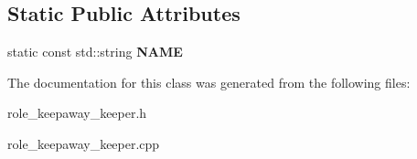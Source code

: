 \subsection*{Static Public Attributes}
\begin{DoxyCompactItemize}
\item 
\hypertarget{classRoleKeepawayKeeper_a5461ea1f8f0e319e8dd555f147e5b24d}{
static const std::string {\bfseries NAME}}
\label{classRoleKeepawayKeeper_a5461ea1f8f0e319e8dd555f147e5b24d}

\end{DoxyCompactItemize}


The documentation for this class was generated from the following files:\begin{DoxyCompactItemize}
\item 
role\_\-keepaway\_\-keeper.h\item 
role\_\-keepaway\_\-keeper.cpp\end{DoxyCompactItemize}
